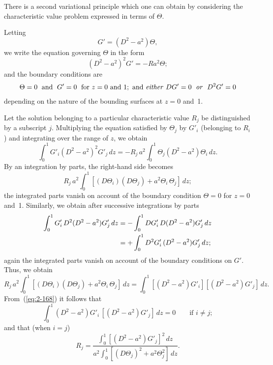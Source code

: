 There is a second variational principle which one can obtain by
considering the characteristic value problem expressed in terms of $\Theta$.

Letting
\begin{equation}
\label{eq:2-162}
G' = (D^2-a^2)\Theta,
\end{equation}
we write the equation governing $\Theta$ in the form
\begin{equation}
\label{eq:2-163}
(D^2-a^2)^2 G' = -Ra^2\Theta;
\end{equation}
and the boundary conditions are
\begin{equation}
\label{eq:2-164}
\Theta = 0 \;\text{ and }\; G' = 0 \;\text{ for } z = 0 \text{ and } 1; \text{ and \emph{either} } DG' = 0 \;\text{ \emph{or} }\; D^2G' = 0
\end{equation}
depending on the nature of the bounding surfaces at $z = 0$ and~1.

Let the solution belonging to a particular characteristic value $R_j$ be
distinguished by a subscript $j$. Multiplying the equation satisfied by
$\Theta_j$ by $G'_i$ (belonging to $R_i$) and integrating over the range of $z$, we obtain
\begin{equation}
\label{eq:2-165}
\int_0^1 G'_i(D^2-a^2)^2 G'_j\,dz = -R_j\,a^2\!\int_0^1 \Theta_j(D^2-a^2)\Theta_i\,dz.
\end{equation}
By an integration by parts, the right-hand side becomes
\begin{equation}
\label{eq:2-166}
R_j\,a^2\!\int_0^1[(D\Theta_i)(D\Theta_j) + a^2\Theta_i\,\Theta_j]\,dz;
\end{equation}
the integrated parts vanish on account of the boundary condition $\Theta = 0$
for $z = 0$ and~1. Similarly, we obtain after successive integrations by
parts
\begin{align}
\label{eq:2-167}
\int_0^1 G'_i\,D^2(D^2-a^2)G'_j\,dz &= -\int_0^1 DG'_i\,D(D^2-a^2)G'_j\,dz \notag\\
&= +\int_0^1 D^2 G'_i\,(D^2-a^2)G'_j\,dz;
\end{align}
again the integrated parts vanish on account of the boundary conditions
on $G'$. Thus, we obtain
\begin{equation}
\label{eq:2-168}
R_j\,a^2\!\int_0^1[(D\Theta_i)(D\Theta_j)+a^2\Theta_i\,\Theta_j]\,dz = \int_0^1[(D^2-a^2)G'_i][(D^2-a^2)G'_j]\,dz.
\end{equation}
From~(\ref{eq:2-168}) it follows that
\begin{equation}
\label{eq:2-169}
\int_0^1(D^2-a^2)G'_i\,[(D^2-a^2)G'_j]\,dz = 0 \qquad\text{if } i \neq j;
\end{equation}
and that (when $i = j$)
\begin{equation}
\label{eq:2-170}
R_j = \frac{\displaystyle\int_0^1[(D^2-a^2)G'_j]^2\,dz}{a^2\!\displaystyle\int_0^1[(D\Theta_j)^2+a^2\Theta_j^2]\,dz}.
\end{equation}

